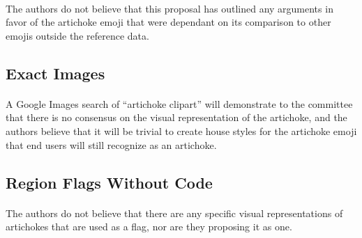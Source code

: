 \documentclass[11pt, oneside,a4paper]{article}
\begin{document}
        \paragraph{}
        The authors do not believe that this proposal has outlined any arguments in favor of the artichoke emoji that were dependant on its comparison to other emojis outside the reference data.
    \subsection{Exact Images}
        \paragraph{}
        A Google Images search of ``artichoke clipart'' will demonstrate to the committee that there is no consensus on the visual representation of the artichoke, and the authors believe that it will be trivial to create house styles for the artichoke emoji that end users will still recognize as an artichoke.

    \subsection{Region Flags Without Code}
        \paragraph{}
        The authors do not believe that there are any specific visual representations of artichokes that are used as a flag, nor are they proposing it as one.

    
\end{document}
